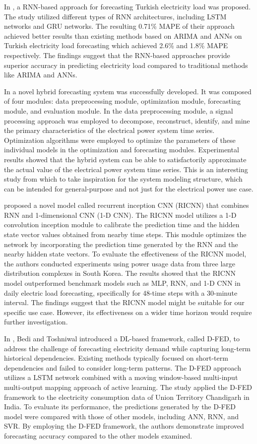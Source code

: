 In \cite{8404313}, a RNN-based approach for forecasting Turkish electricity load was proposed.
The study utilized different types of RNN architectures, including LSTM networks and GRU networks.
The resulting 0.71\% MAPE of their approach achieved better results than existing methods based on ARIMA and ANNs on Turkish electricity load forecasting which achieved 2.6\% and 1.8\% MAPE respectively.
The findings suggest that the RNN-based approaches provide superior accuracy in predicting electricity load compared to traditional methods like ARIMA and ANNs.

In \cite{DU2018533} a novel hybrid forecasting system was successfully developed.
It was composed of four modules: data preprocessing module, optimization module, forecasting module, and evaluation module.
In the data preprocessing module, a signal processing approach was employed to decompose, reconstruct, identify, and mine the primary characteristics of the electrical power system time series.
Optimization algorithms were employed to optimize the parameters of these individual models in the optimization and forecasting modules.
Experimental results showed that the hybrid system can be able to satisfactorily approximate the actual value of the electrical power system time series.
This is an interesting study from which to take inspiration for the system modeling structure, which can be intended for general-purpose and not just for the electrical power use case.

\cite{KIM2019328} proposed a novel model called recurrent inception CNN (RICNN) that combines RNN and 1-dimensional CNN (1-D CNN).
The RICNN model utilizes a 1-D convolution inception module to calibrate the prediction time and the hidden state vector values obtained from nearby time steps.
This module optimizes the network by incorporating the prediction time generated by the RNN and the nearby hidden state vectors.
To evaluate the effectiveness of the RICNN model, the authors conducted experiments using power usage data from three large distribution complexes in South Korea.
The results showed that the RICNN model outperformed benchmark models such as MLP, RNN, and 1-D CNN in daily electric load forecasting, specifically for 48-time steps with a 30-minute interval.
The findings suggest that the RICNN model might be suitable for our specific use case.
However, its effectiveness on a wider time horizon would require further investigation.

In \cite{BEDI20191312}, Bedi and Toshniwal introduced a DL-based framework, called D-FED, to address the challenge of forecasting electricity demand while capturing long-term historical dependencies.
Existing methods typically focused on short-term dependencies and failed to consider long-term patterns.
The D-FED approach utilizes a LSTM network combined with a moving window-based multi-input multi-output mapping approach of active learning.
The study applied the D-FED framework to the electricity consumption data of Union Territory Chandigarh in India.
To evaluate its performance, the predictions generated by the D-FED model were compared with those of other models, including ANN, RNN, and SVR.
By employing the D-FED framework, the authors demonstrate improved forecasting accuracy compared to the other models examined.

